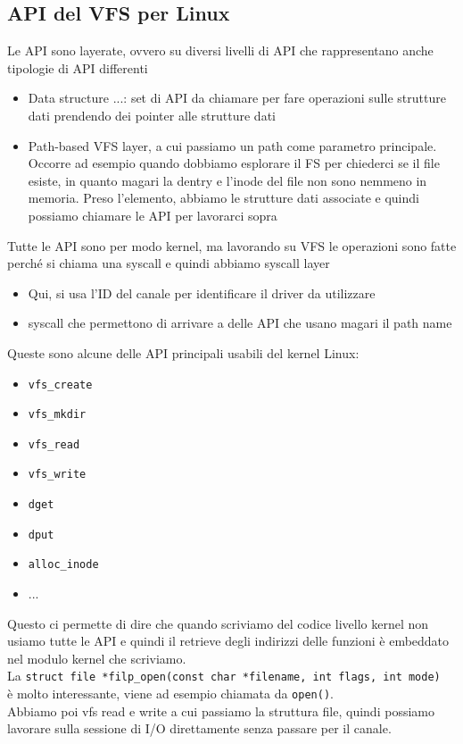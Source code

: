 \documentclass[12pt, oneside]{extbook}
\begin{document}
\subsection{API del VFS per Linux}
Le API sono layerate, ovvero su diversi livelli di API che rappresentano anche tipologie di API differenti
\begin{itemize}
\item Data structure ...: set di API da chiamare per fare operazioni sulle strutture dati prendendo dei pointer alle strutture dati
\item Path-based VFS layer, a cui passiamo un path come parametro principale. Occorre ad esempio quando dobbiamo esplorare il FS per chiederci se il file esiste, in quanto magari la dentry e l'inode del file non sono nemmeno in memoria. Preso l'elemento, abbiamo le strutture dati associate e quindi possiamo chiamare le API per lavorarci sopra
\end{itemize}
Tutte le API sono per modo kernel, ma lavorando su VFS le operazioni sono fatte perché si chiama una syscall e quindi abbiamo syscall layer
\begin{itemize}
\item Qui, si usa l'ID del canale per identificare il driver da utilizzare
\item syscall che permettono di arrivare a delle API che usano magari il path name
\end{itemize}
Queste sono alcune delle API principali usabili del kernel Linux:
\begin{itemize}
	\item \texttt{vfs\_create}
	\item \texttt{vfs\_mkdir}
	\item \texttt{vfs\_read}
	\item \texttt{vfs\_write}
	\item \texttt{dget}
	\item \texttt{dput}
	\item \texttt{alloc\_inode}
	\item ...
\end{itemize}
Questo ci permette di dire che quando scriviamo del codice livello kernel non usiamo tutte le API e quindi il retrieve degli indirizzi delle funzioni è embeddato nel modulo kernel che scriviamo.\\La \texttt{struct file *filp\_open(const char *filename, int flags, int mode)}\\ è molto interessante, viene ad esempio chiamata da \texttt{open()}.\\Abbiamo poi vfs read e write a cui passiamo la struttura file, quindi possiamo lavorare sulla sessione di I/O direttamente senza passare per il canale.
\end{document}
